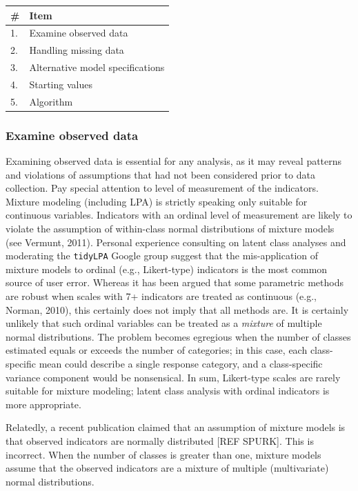\documentclass[
  ,man]{apa6}
\begin{document}
\begin{tabular}[t]{l|l}
\hline
\# & Item\\
\hline
1. & Examine observed data\\
\hline
2. & Handling missing data\\
\hline
3. & Alternative model specifications\\
\hline
4. & Starting values\\
\hline
5. & Algorithm\\
\hline
\end{tabular}

\hypertarget{examine-observed-data}{%
\subsubsection{Examine observed data}\label{examine-observed-data}}

Examining observed data is essential for any analysis,
as it may reveal patterns and violations of assumptions that had not been considered prior to data collection.
Pay special attention to level of measurement of the indicators.
Mixture modeling (including LPA) is strictly speaking only suitable for continuous variables.
Indicators with an ordinal level of measurement are likely to violate the assumption of within-class normal distributions of mixture models (see Vermunt, 2011).
Personal experience consulting on latent class analyses and moderating the \texttt{tidyLPA} Google group
suggest that the mis-application of mixture models to ordinal (e.g., Likert-type) indicators is the most common source of user error.
Whereas it has been argued that some parametric methods are robust when scales with 7+ indicators are treated as continuous (e.g., Norman, 2010),
this certainly does not imply that all methods are.
It is certainly unlikely that such ordinal variables can be treated as a \emph{mixture} of multiple normal distributions.
The problem becomes egregious when the number of classes estimated equals or exceeds the number of categories; in this case, each class-specific mean could describe a single response category, and a class-specific variance component would be nonsensical.
In sum, Likert-type scales are rarely suitable for mixture modeling;
latent class analysis with ordinal indicators is more appropriate.

Relatedly, a recent publication claimed that an assumption of mixture models is that observed indicators are normally distributed {[}REF SPURK{]}.
This is incorrect.
When the number of classes is greater than one, mixture models assume that the observed indicators are a mixture of multiple (multivariate) normal distributions.
\end{document}
